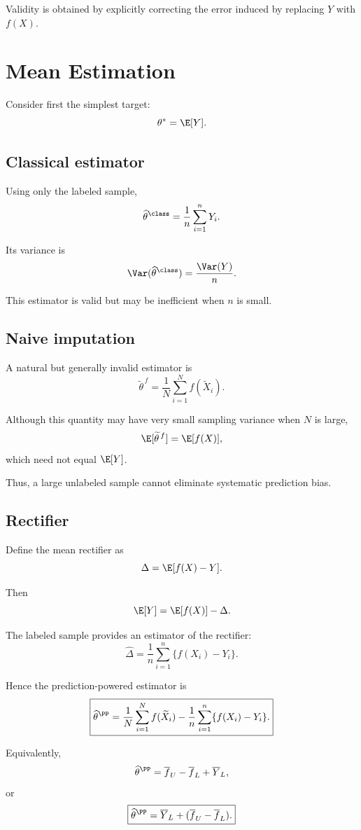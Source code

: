 Validity is obtained by explicitly correcting the error induced by
replacing $Y$ with $f(X)$.

\section{Mean Estimation}

Consider first the simplest target:
\[
\theta^*=\E[Y].
\]

\subsection{Classical estimator}

Using only the labeled sample,
\[
\widehat{\theta}^{\class}
=
\frac{1}{n}\sum_{i=1}^n Y_i.
\]

Its variance is
\[
\Var(\widehat{\theta}^{\class})
=
\frac{\Var(Y)}{n}.
\]

This estimator is valid but may be inefficient when $n$ is small.

\subsection{Naive imputation}

A natural but generally invalid estimator is
\[
\widetilde{\theta}^{\,f}
=
\frac{1}{N}\sum_{i=1}^N f(\widetilde X_i).
\]

Although this quantity may have very small sampling variance when $N$ is
large,
\[
\E[\widetilde{\theta}^{\,f}]
=
\E[f(X)],
\]
which need not equal $\E[Y]$.

Thus, a large unlabeled sample cannot eliminate systematic prediction
bias.

\subsection{Rectifier}

Define the mean rectifier as
\[
\Delta
=
\E[f(X)-Y].
\]

Then
\[
\E[Y]
=
\E[f(X)]-\Delta.
\]

The labeled sample provides an estimator of the rectifier:
\[
\widehat{\Delta}
=
\frac{1}{n}
\sum_{i=1}^n
\{f(X_i)-Y_i\}.
\]

Hence the prediction-powered estimator is
\[
\boxed{
\widehat{\theta}^{\PP}
=
\frac{1}{N}\sum_{i=1}^N f(\widetilde X_i)
-
\frac{1}{n}\sum_{i=1}^n
\{f(X_i)-Y_i\}.
}
\]

Equivalently,
\[
\widehat{\theta}^{\PP}
=
\overline f_U-\overline f_L+\overline Y_L,
\]
or
\[
\boxed{
\widehat{\theta}^{\PP}
=
\overline Y_L
+
(\overline f_U-\overline f_L).
}
\]


